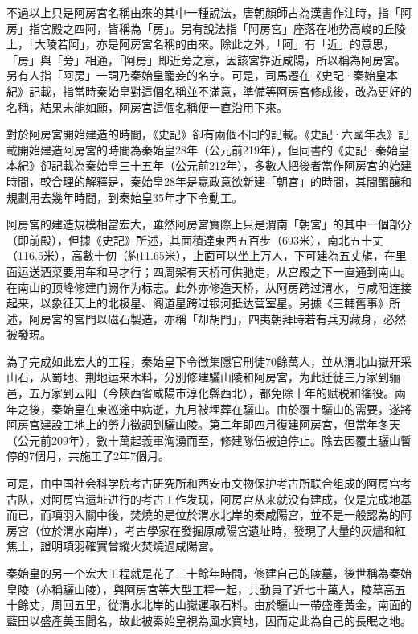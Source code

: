 不過以上只是阿房宮名稱由來的其中一種說法，唐朝顏師古為漢書作注時，指「阿房」指宮殿之四阿，皆稱為「房」。另有說法指「阿房宮」座落在地势高峻的丘陵上，「大陵若阿」，亦是阿房宮名稱的由來。除此之外，「阿」有「近」的意思，「房」與「旁」相通，「阿房」即近旁之意，因該宮靠近咸陽，所以稱為阿房宮。另有人指「阿房」一詞乃秦始皇寵妾的名字。可是，司馬遷在《史記·秦始皇本紀》記載，指當時秦始皇對這個名稱並不滿意，準備等阿房宮修成後，改為更好的名稱，結果未能如願，阿房宮這個名稱便一直沿用下來。

對於阿房宮開始建造的時間，《史記》卻有兩個不同的記載。《史記·六國年表》記載開始建造阿房宮的時間為秦始皇28年（公元前219年），但同書的《史記·秦始皇本紀》卻記載為秦始皇三十五年（公元前212年），多數人把後者當作阿房宮的始建時間，較合理的解釋是，秦始皇28年是嬴政意欲新建「朝宮」的時間，其間醞釀和規劃用去幾年時間，到秦始皇35年才下令動工。

阿房宮的建造規模相當宏大，雖然阿房宮實際上只是渭南「朝宮」的其中一個部分（即前殿），但據《史記》所述，其面積達東西五百步（693米），南北五十丈（116.5米），高數十仞（約11.65米），上面可以坐上万人，下可建為五丈旗，在里面运送酒菜要用车和马才行；四周架有天桥可供驰走，从宫殿之下一直通到南山。在南山的顶峰修建门阙作为标志。此外亦修造天桥，从阿房跨过渭水，与咸阳连接起来，以象征天上的北极星、阁道星跨过银河抵达营室星。另據《三輔舊事》所述，阿房宮的宮門以磁石製造，亦稱「却胡門」，四夷朝拜時若有兵刃藏身，必然被發現。

為了完成如此宏大的工程，秦始皇下令徵集隱官刑徒70餘萬人，並从渭北山嶽开采山石，从蜀地、荆地运来木料，分別修建驪山陵和阿房宮，为此迁徙三万家到骊邑，五万家到云阳（今陝西省咸陽市淳化縣西北），都免除十年的赋税和徭役。兩年之後，秦始皇在東巡途中病逝，九月被埋葬在驪山。由於覆土驪山的需要，遂將阿房宮建設工地上的勞力徵調到驪山陵。第二年即四月復建阿房宮，但當年冬天（公元前209年），數十萬起義軍洶湧而至，修建隊伍被迫停止。除去因覆土驪山暫停的7個月，共施工了2年7個月。

可是，由中国社会科学院考古研究所和西安市文物保护考古所联合组成的阿房宫考古队，对阿房宫遗址进行的考古工作发现，阿房宫从来就没有建成，仅是完成地基而已，而項羽入關中後，焚燒的是位於渭水北岸的秦咸陽宮，並不是一般認為的阿房宮（位於渭水南岸），考古學家在發掘原咸陽宮遺址時，發現了大量的灰燼和紅焦土，證明項羽確實曾縱火焚燒過咸陽宮。

秦始皇的另一个宏大工程就是花了三十餘年時間，修建自己的陵墓，後世稱為秦始皇陵（亦稱驪山陵），與阿房宮等大型工程一起，共動員了近七十萬人，陵墓高五十餘丈，周回五里，從渭水北岸的山嶽運取石料。由於驪山一帶盛產黃金，南面的藍田以盛產美玉聞名，故此被秦始皇視為風水寶地，因而定此為自己的長眠之地。

